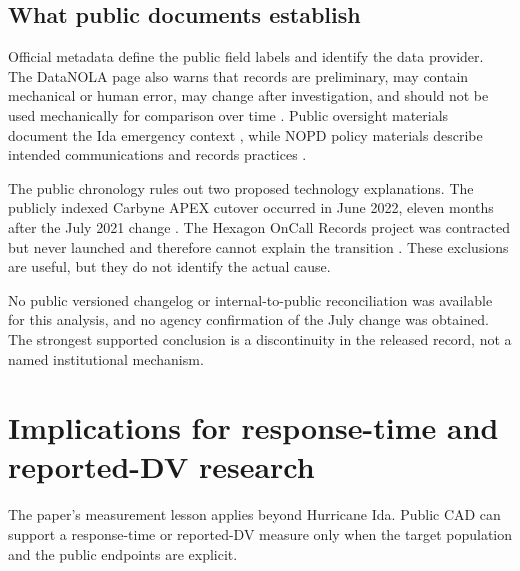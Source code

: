 \documentclass[11pt]{article}
\begin{document}
\subsection{What public documents establish}

Official metadata define the public field labels and identify the data provider. The DataNOLA page also warns that records are preliminary, may contain mechanical or human error, may change after investigation, and should not be used mechanically for comparison over time \citep{DataNOLA2021}. Public oversight materials document the Ida emergency context \citep{OIPM2021}, while NOPD policy materials describe intended communications and records practices \citep{NOPDPolicies2023}.

The public chronology rules out two proposed technology explanations. The publicly indexed Carbyne APEX cutover occurred in June 2022, eleven months after the July 2021 change \citep{OPCDCarbyne2022}. The Hexagon OnCall Records project was contracted but never launched and therefore cannot explain the transition \citep{NOLAOIGHexagon2024}. These exclusions are useful, but they do not identify the actual cause.

No public versioned changelog or internal-to-public reconciliation was available for this analysis, and no agency confirmation of the July change was obtained. The strongest supported conclusion is a discontinuity in the released record, not a named institutional mechanism.

\section{Implications for response-time and reported-DV research}

The paper's measurement lesson applies beyond Hurricane Ida. Public CAD can support a response-time or reported-DV measure only when the target population and the public endpoints are explicit.
\end{document}

